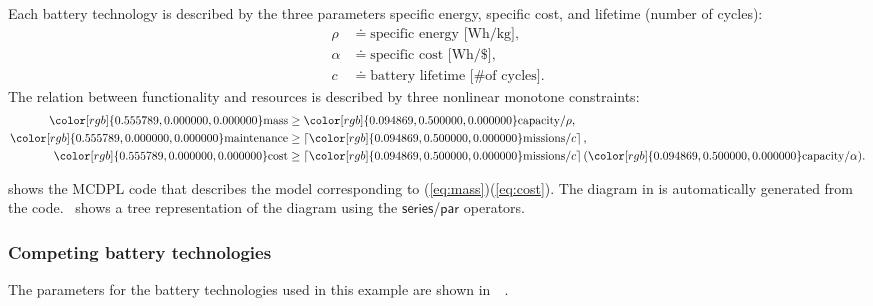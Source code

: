 \documentclass[twocolumn,english]{IEEEtran}
\theoremstyle{definition}
\theoremstyle{plain}
\theoremstyle{definition}
\theoremstyle{remark}
\theoremstyle{definition}
\theoremstyle{plain}
\theoremstyle{plain}
\newcommand{\aword}[1]{\mathsf{#1}}
\newcommand{\vmath}[1]{\aword{#1}}
\newcommand{\dpseries}{\vmath{series}}
\newcommand{\dppar}{\vmath{par}}
\newcommand{\colR}{\color[rgb]{0.555789,0.000000,0.000000}}
\newcommand{\colF}{\color[rgb]{0.094869,0.500000,0.000000}}
\newcommand{\R}[1]{{\colR #1}}
\newcommand{\F}[1]{{\colF #1}}
\begin{document}
Each battery technology is described by the three parameters specific
energy, specific cost, and lifetime (number of cycles):
\begin{align*}
\rho & \doteq\text{specific energy [Wh/kg]},\\
\alpha & \doteq\text{specific cost [Wh/\$]},\\
c & \doteq\text{battery lifetime [\# of cycles]}.
\end{align*}
The relation between functionality and resources is described by three
nonlinear monotone constraints: 
\begin{align}
\R{\text{mass}} & \geq\F{\text{capacity}}/\rho,\label{eq:mass}\\
\R{\text{maintenance}} & \geq\left\lceil \F{\text{missions}}/c\right\rceil ,\label{eq:maintenance}\\
\R{\text{cost}} & \geq\left\lceil \F{\text{missions}}/c\right\rceil (\F{\text{capacity}}/\alpha).\label{eq:cost}
\end{align}

 shows the MCDPL code that describes the
model corresponding to (\ref{eq:mass})\textendash (\ref{eq:cost}).
The diagram in  is automatically generated
from the code. ~shows a tree representation
of the diagram using the $\dpseries$/$\dppar$ operators. 

\subsubsection*{Competing battery technologies}

The parameters for the battery technologies used in this example are
shown in~~. 
\end{document}

